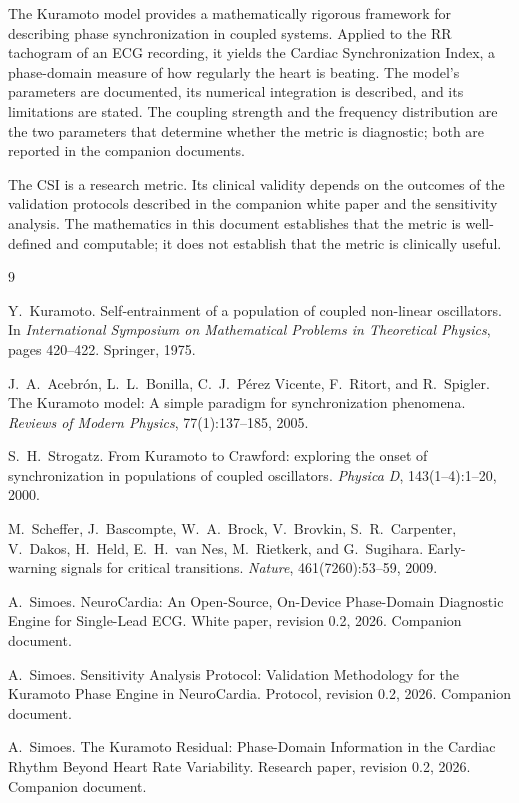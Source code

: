 \documentclass[11pt]{article}
\begin{document}
The Kuramoto model provides a mathematically rigorous framework for
describing phase synchronization in coupled systems. Applied to the RR
tachogram of an ECG recording, it yields the Cardiac Synchronization
Index, a phase-domain measure of how regularly the heart is beating.
The model's parameters are documented, its numerical integration is
described, and its limitations are stated. The coupling strength and
the frequency distribution are the two parameters that determine
whether the metric is diagnostic; both are reported in the companion
documents.

The CSI is a research metric. Its clinical validity depends on the
outcomes of the validation protocols described in the companion white
paper and the sensitivity analysis. The mathematics in this document
establishes that the metric is well-defined and computable; it does not
establish that the metric is clinically useful.

\begin{thebibliography}{9}

Y.~Kuramoto. Self-entrainment of a population of coupled non-linear
oscillators. In \emph{International Symposium on Mathematical Problems
in Theoretical Physics}, pages 420--422. Springer, 1975.

J.~A.~Acebr\'on, L.~L.~Bonilla, C.~J.~P\'erez Vicente, F.~Ritort, and
R.~Spigler. The Kuramoto model: A simple paradigm for synchronization
phenomena. \emph{Reviews of Modern Physics}, 77(1):137--185, 2005.

S.~H.~Strogatz. From Kuramoto to Crawford: exploring the onset of
synchronization in populations of coupled oscillators.
\emph{Physica D}, 143(1--4):1--20, 2000.

M.~Scheffer, J.~Bascompte, W.~A.~Brock, V.~Brovkin, S.~R.~Carpenter,
V.~Dakos, H.~Held, E.~H.~van Nes, M.~Rietkerk, and G.~Sugihara.
Early-warning signals for critical transitions. \emph{Nature},
461(7260):53--59, 2009.

A.~Simoes. NeuroCardia: An Open-Source, On-Device Phase-Domain
Diagnostic Engine for Single-Lead ECG. White paper, revision 0.2, 2026.
Companion document.

A.~Simoes. Sensitivity Analysis Protocol: Validation Methodology for
the Kuramoto Phase Engine in NeuroCardia. Protocol, revision 0.2, 2026.
Companion document.

A.~Simoes. The Kuramoto Residual: Phase-Domain Information in the
Cardiac Rhythm Beyond Heart Rate Variability. Research paper, revision
0.2, 2026. Companion document.

\end{thebibliography}
\end{document}

